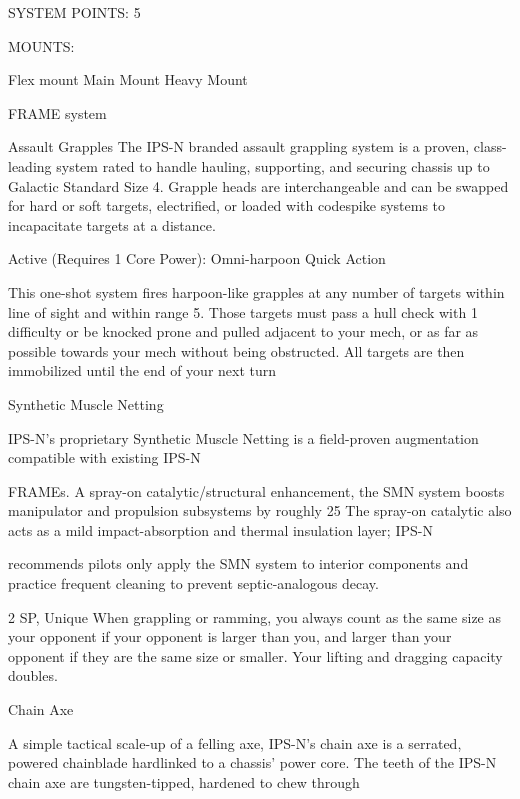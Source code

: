                                                SYSTEM POINTS: 5

                                                     MOUNTS:

  Flex mount                          Main Mount                             Heavy Mount

                                                  FRAME system




                                                   Assault Grapples
   The IPS-N branded assault grappling system is a proven, class-leading system rated to handle hauling,
  supporting, and securing chassis up to Galactic Standard Size 4. Grapple heads are interchangeable
  and can be swapped for hard or soft targets, electrified, or loaded with codespike systems to
  incapacitate targets at a distance.


  Active (Requires 1 Core Power): Omni-harpoon
   Quick Action

  This one-shot system fires harpoon-like grapples at any number of targets within line of sight and within
   range 5. Those targets must pass a hull check with 1 difficulty or be knocked prone and pulled adjacent
  to your mech, or as far as possible towards your mech without being obstructed. All targets are then
   immobilized until the end of your next turn

Synthetic Muscle Netting

IPS-N’s proprietary Synthetic Muscle Netting is a field-proven augmentation compatible with existing IPS-N

FRAMEs. A spray-on catalytic/structural enhancement, the SMN system boosts manipulator and
propulsion subsystems by roughly 25%
The spray-on catalytic also acts as a mild impact-absorption and thermal insulation layer; IPS-N

recommends pilots only apply the SMN system to interior components and practice frequent cleaning to
prevent septic-analogous decay.

2 SP, Unique
When grappling or ramming, you always count as the same size as your opponent if your
opponent is larger than you, and larger than your opponent if they are the same size or smaller.
Your lifting and dragging capacity doubles.


Chain Axe

A simple tactical scale-up of a felling axe, IPS-N’s chain axe is a serrated, powered chainblade hardlinked
to a chassis’ power core. The teeth of the IPS-N chain axe are tungsten-tipped, hardened to chew through

